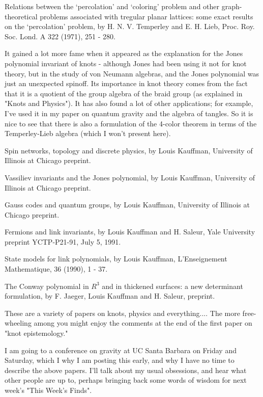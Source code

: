 Relations between the `percolation' and `coloring' problem and other graph-theoretical problems associated with tregular planar lattices: some exact results on the `percolation' problem, by H. N. V. Temperley and E. H. Lieb, Proc. Roy. Soc. Lond. A 322 (1971), 251 - 280.

It gained a lot more fame when it appeared as the explanation for the Jones polynomial invariant of knots - although Jones had been using it not for knot theory, but in the study of von Neumann algebras, and the Jones polynomial was just an unexpected spinoff. Its importance in knot theory comes from the fact that it is a quotient of the group algebra of the braid group (as explained in "Knots and Physics"). It has also found a lot of other applications; for example, I've used it in my paper on quantum gravity and the algebra of tangles. So it is nice to see that there is also a formulation of the 4-color theorem in terms of the Temperley-Lieb algebra (which I won't present here).


Spin networks, topology and discrete physics, by Louis Kauffman, University of Illinois at Chicago preprint.

Vassiliev invariants and the Jones polynomial, by Louis Kauffman, University of Illinois at Chicago preprint.

Gauss codes and quantum groups, by Louis Kauffman, University of Illinois at Chicago preprint.

Fermions and link invariants, by Louis Kauffman and H. Saleur, Yale University preprint YCTP-P21-91, July 5, 1991.

State models for link polynomials, by Louis Kauffman, L'Enseignement Mathematique, 36 (1990), 1 - 37.

The Conway polynomial in $R^3$ and in thickened surfaces: a new determinant formulation, by F. Jaeger, Louis Kauffman and H. Saleur, preprint.

These are a variety of papers on knots, physics and everything.... The more free-wheeling among you might enjoy the comments at the end of the first paper on "knot epistemology."

I am going to a conference on gravity at UC Santa Barbara on Friday and Saturday, which I why I am posting this early, and why I have no time to describe the above papers. I'll talk about my usual obsessions, and hear what other people are up to, perhaps bringing back some words of wisdom for next week's "This Week's Finds". 